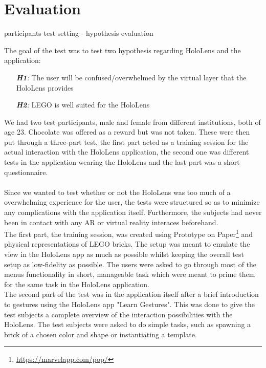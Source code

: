 
\section{Evaluation}

participants
test setting
	- hypothesis
evaluation

The goal of the test was to test two hypothesis regarding HoloLens and the application:
\begin{itemize}
	\item[\textit{\textbf{H1}:}] The user will be confused/overwhelmed by the virtual layer that the HoloLens provides
	\item[\textit{\textbf{H2}:}] LEGO is well suited for the HoloLens
\end{itemize}
We had two test participants, male and female from different institutions, both of age 23. Chocolate was offered as a reward but was not taken. These were then put through a three-part test, the first part acted as a training session for the actual interaction with the HoloLens application, the second one was different tests in the application wearing the HoloLens and the last part was a short questionnaire.\\
\\
Since we wanted to test whether or not the HoloLens was too much of a overwhelming experience for the user, the tests were structured so as to minimize any complications with the application itself. Furthermore, the subjects had never been in contact with any AR or virtual reality interaces beforehand.\\
The first part, the training session, was created using Prototype on Paper\footnote{\url{https://marvelapp.com/pop/}} and physical representations of LEGO bricks. The setup was meant to emulate the view in the HoloLens app as much as possible whilst keeping the overall test setup as low-fidelity as possible. The users were asked to go through most of the menus functionality in short, manageable task which were meant to prime them for the same task in the HoloLens application.\\
The second part of the test was in the application itself after a brief introduction to gestures using the HoloLens app "Learn Gestures". This was done to give the test subjects a complete overview of the interaction possibilities with the HoloLens. The test subjects were asked to do simple tasks, such as spawning a brick of a chosen color and shape or instantiating a template.\\
